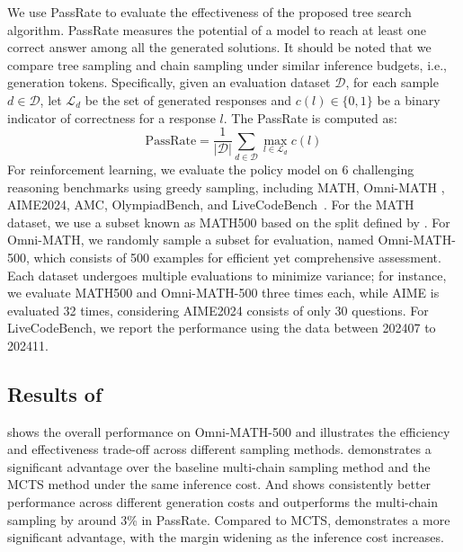 We use PassRate to evaluate the effectiveness of the proposed tree search algorithm. PassRate measures the potential of a model to reach at least one correct answer among all the generated solutions. 
It should be noted that we compare tree sampling and chain sampling under similar inference budgets, i.e., generation tokens.
Specifically, given an evaluation dataset $\mathcal{D}$, for each sample $d \in \mathcal{D}$, let $\mathcal{L}_d$ be the set of generated responses and $c(l)\in \{0,1\}$ be a binary indicator of correctness for a response $l$. The PassRate is computed as:
\[
\text{PassRate} = \frac{1}{|\mathcal{D}|} \sum_{d \in \mathcal{D}} \max_{l \in \mathcal{L}_d} c(l)
\]
For reinforcement learning, we evaluate the policy model on 6 challenging reasoning benchmarks using greedy sampling, 
including MATH\citep{hendrycksmath2021}, Omni-MATH \citep{gao2024omni}, AIME2024\citep{li2024numinamath}, AMC\citep{li2024numinamath}, OlympiadBench\citep{he2024olympiadbench}, and LiveCodeBench~\citep{jain2024livecodebench}. For the MATH dataset, we use a subset known as MATH500 based on the split defined by \citep{lightmanlet}. For Omni-MATH, we randomly sample a subset for evaluation, named Omni-MATH-500, which consists of 500 examples for efficient yet comprehensive assessment. Each dataset undergoes multiple evaluations to minimize variance; for instance, we evaluate MATH500 and Omni-MATH-500 three times each, while AIME is evaluated 32 times, considering AIME2024 consists of only 30 questions. For LiveCodeBench, we report the performance using the data between 202407 to 202411.




\subsection{Results of \treemodel}
 shows the overall performance on Omni-MATH-500 and illustrates the efficiency and effectiveness trade-off across different sampling methods. 
\treemodel demonstrates a significant advantage over the baseline multi-chain sampling method and the MCTS method under the same inference cost. And \treemodel shows consistently better performance across different generation costs and outperforms the multi-chain sampling by around 3\% in PassRate. Compared to MCTS, \treemodel demonstrates a more significant advantage, with the margin widening as the inference cost increases.

